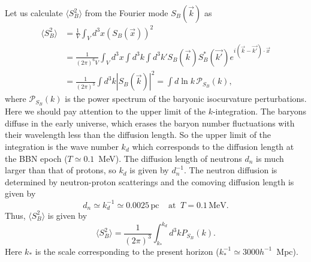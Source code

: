 \documentclass[11pt,a4paper]{article}
\begin{document}
Let us calculate $\langle S_B^2 \rangle$ from the Fourier mode $S_B(\vec{k})$ as
\begin{align}
    \langle S_B^2\rangle & = \frac{1}{V}\int_V d^3 x (S_B(\vec{x}))^2\nonumber \\[0.5em]
     & = \frac{1}{(2\pi)^6V}\int_V d^3x
    \int d^3k \int d^3k' S_B(\vec{k})S_B^*(\vec{k'})e^{i(\vec{k}-\vec{k'})\cdot \vec{x}}
    \nonumber \\[0.5em]
    & = \frac{1}{(2\pi)^3}\int d^3 k |S_B(\vec{k})|^2
    = \int d\ln k \,\mathcal{P}_{S_B}(k),
\end{align}
where $\mathcal{P}_{S_B}(k)$ is the power spectrum of the baryonic isocurvature perturbations.
Here we should pay attention to the upper limit of the $k$-integration.
The baryons diffuse in the early universe, which erases the baryon number fluctuations with their wavelength less than the diffusion length.
So the upper limit of the integration is the wave number $k_d$ which corresponds to the diffusion length at the BBN epoch ($T\simeq 0.1$~MeV).
The diffusion length of neutrons $d_n$ is much larger than that of protons, so $k_d$ is given by $d_n^{-1}$.
The neutron diffusion is determined by neutron-proton scatterings and the comoving diffusion length is given by~\cite{Applegate:1987hm}
\begin{equation}
    d_n \simeq k_d^{-1} \simeq 0.0025\, \text{pc}~~~~~\text{at }~T=0.1\,\text{MeV}.
\end{equation}
Thus, $\langle S_B^2 \rangle$ is given by
\begin{equation}
    \langle S_B^2\rangle = \frac{1}{(2\pi)^3}\int^{k_d}_{k_*} d^3k P_{S_B}(k).
    \label{eq:isocuravture_fluc}
\end{equation}
Here $k_*$ is the scale corresponding to the present horizon ($k_*^{-1} \simeq 3000h^{-1}$~Mpc).
\end{document}
